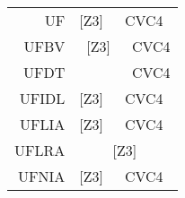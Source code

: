 \begin{table}
{\begin{tabular}{|rccc|}
    \multicolumn{1}{|r|}{UF}         & \multicolumn{1}{c|}{{[}Z3{]}}      & \multicolumn{2}{c|}{CVC4}                                                    \\ \cline{2-4} 
    \multicolumn{1}{|r|}{UFBV}       & \multicolumn{2}{c|}{{[}Z3{]}}                                                  & \multicolumn{1}{c|}{CVC4}        \\ \cline{2-4} 
    UFDT                             &                                    &                                           & \multicolumn{1}{|c|}{CVC4}       \\ \cline{2-4} 
    \multicolumn{1}{|r|}{UFIDL}      & \multicolumn{1}{c|}{{[}Z3{]}}      & \multicolumn{2}{c|}{CVC4}                                                    \\ \cline{2-4} 
    \multicolumn{1}{|r|}{UFLIA}      & \multicolumn{1}{c|}{{[}Z3{]}}      & \multicolumn{2}{c|}{CVC4}                                                    \\ \cline{2-4} 
    \multicolumn{1}{|r|}{UFLRA}      & \multicolumn{3}{c|}{{[}Z3{]}}                                                                                     \\ \cline{2-4} 
    \multicolumn{1}{|r|}{UFNIA}      & \multicolumn{1}{c|}{{[}Z3{]}}      & \multicolumn{2}{c|}{CVC4}                                                    \\ \hline
  \end{tabular}}
\end{table}
